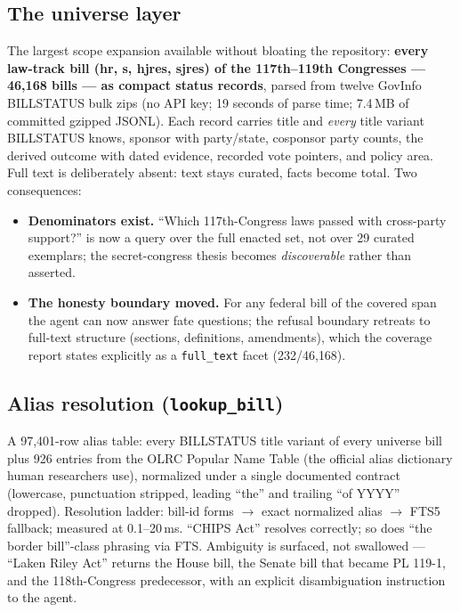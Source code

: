 \documentclass[11pt]{article}
\newcommand{\code}[1]{\texttt{#1}}
\begin{document}
\subsection{The universe layer}

The largest scope expansion available without bloating the repository:
\textbf{every law-track bill (hr, s, hjres, sjres) of the 117th--119th
Congresses --- 46{,}168 bills --- as compact status records}, parsed from
twelve GovInfo BILLSTATUS bulk zips (no API key; 19 seconds of parse
time; 7.4\,MB of committed gzipped JSONL). Each record carries title and
\emph{every} title variant BILLSTATUS knows, sponsor with party/state,
cosponsor party counts, the derived outcome with dated evidence, recorded
vote pointers, and policy area. Full text is deliberately absent: text
stays curated, facts become total. Two consequences:

\begin{itemize}[itemsep=2pt]
  \item \textbf{Denominators exist.} ``Which 117th-Congress laws passed
        with cross-party support?'' is now a query over the full enacted
        set, not over 29 curated exemplars; the secret-congress thesis
        becomes \emph{discoverable} rather than asserted.
  \item \textbf{The honesty boundary moved.} For any federal bill of the
        covered span the agent can now answer fate questions; the
        refusal boundary retreats to full-text structure (sections,
        definitions, amendments), which the coverage report states
        explicitly as a \code{full\_text} facet (232/46{,}168).
\end{itemize}

\subsection{Alias resolution (\code{lookup\_bill})}

A 97{,}401-row alias table: every BILLSTATUS title variant of every
universe bill plus 926 entries from the OLRC Popular Name Table (the
official alias dictionary human researchers use), normalized under a
single documented contract (lowercase, punctuation stripped, leading
``the'' and trailing ``of YYYY'' dropped). Resolution ladder: bill-id
forms $\to$ exact normalized alias $\to$ FTS5 fallback; measured at
0.1--20\,ms. ``CHIPS Act'' resolves correctly; so does ``the border
bill''-class phrasing via FTS. Ambiguity is surfaced, not swallowed ---
``Laken Riley Act'' returns the House bill, the Senate bill that became
PL 119-1, and the 118th-Congress predecessor, with an explicit
disambiguation instruction to the agent.
\end{document}
